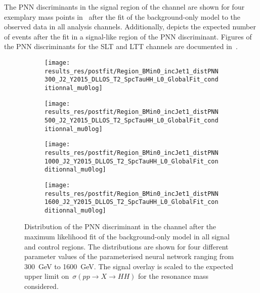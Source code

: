 The PNN discriminants in the signal region of the \hadhad channel are
shown for four exemplary mass points
in~ after the fit of the
background-only model to the observed data in all analysis channels.
Additionally,  depicts the expected
number of events after the fit in a signal-like region of the PNN
discriminant. Figures of the PNN discriminants for the \lephad SLT and
LTT channels are documented in~.

\begin{figure}[htbp]
  \centering

  \begin{subfigure}{0.495\textwidth}
    \centering

    \texttt{[image: results\_res/postfit/Region\_BMin0\_incJet1\_distPNN300\_J2\_Y2015\_DLLOS\_T2\_SpcTauHH\_L0\_GlobalFit\_conditionnal\_mu0log]}
  \end{subfigure}\hfill%
  \begin{subfigure}{0.495\textwidth}
    \centering

    \texttt{[image: results\_res/postfit/Region\_BMin0\_incJet1\_distPNN500\_J2\_Y2015\_DLLOS\_T2\_SpcTauHH\_L0\_GlobalFit\_conditionnal\_mu0log]}
  \end{subfigure}

  \begin{subfigure}{0.495\textwidth}
    \centering

    \texttt{[image: results\_res/postfit/Region\_BMin0\_incJet1\_distPNN1000\_J2\_Y2015\_DLLOS\_T2\_SpcTauHH\_L0\_GlobalFit\_conditionnal\_mu0log]}
    \label{fig:pnn1000_postfit}
  \end{subfigure}\hfill%
  \begin{subfigure}{0.495\textwidth}
    \centering

    \texttt{[image: results\_res/postfit/Region\_BMin0\_incJet1\_distPNN1600\_J2\_Y2015\_DLLOS\_T2\_SpcTauHH\_L0\_GlobalFit\_conditionnal\_mu0log]}
  \end{subfigure}

  \caption{Distribution of the PNN discriminant in the \hadhad channel
    after the maximum likelihood fit of the background-only model in
    all signal and control regions. The distributions are shown for
    four different parameter values of the parameterised neural network
    ranging from \SI{300}{\GeV} to \SI{1600}{\GeV}. The signal overlay
    is scaled to the expected upper limit on~$\sigma(pp \to X \to HH)$
    for the resonance mass considered.}%
  \label{fig:resonant_mva_postfit}
\end{figure}


